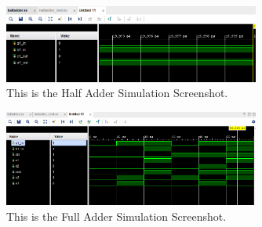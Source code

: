 \documentclass[11pt]{article}
\begin{document}
\begin{enumerate}
	
\begin{figure}[ht]\centering
	\includegraphics[width=0.75\textwidth]{Half Adder Simulation}
	\caption{This is the Half Adder Simulation Screenshot.}
	\label{fig:half_adder_sim}	
\end{figure}

\begin{figure}[ht]\centering
	\includegraphics[width=0.75\textwidth]{Full Adder Simulation}
	\caption{This is the Full Adder Simulation Screenshot.}
	\label{fig:full_adder_sim}	
\end{figure}

\end{enumerate}
	
\end{document}
